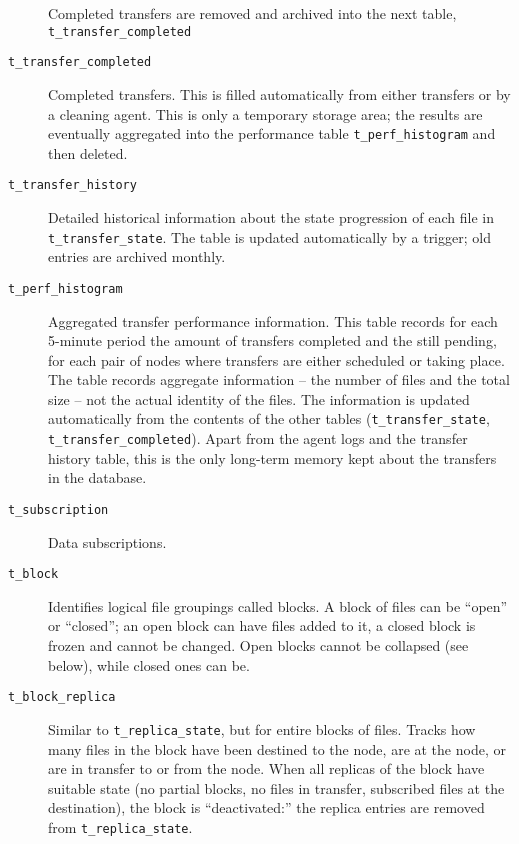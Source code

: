 \documentclass{cmspaper}
\begin{document}
\begin{description}
    Completed transfers are removed and archived into the next
    table, \texttt{t\_transfer\_completed}

  \item [\texttt{t\_transfer\_completed}]\mbox{}

    Completed transfers.  This is filled automatically from either
    transfers or by a cleaning agent.  This is only a temporary
    storage area; the results are eventually aggregated into the
    performance table \texttt{t\_perf\_histogram} and then deleted.

  \item [\texttt{t\_transfer\_history}]\mbox{}

    Detailed historical information about the state progression of
    each file in \texttt{t\_transfer\_state}.  The table is updated
    automatically by a trigger; old entries are archived monthly.

  \item [\texttt{t\_perf\_histogram}]\mbox{}

    Aggregated transfer performance information.  This table records
    for each 5-minute period the amount of transfers completed and
    the still pending, for each pair of nodes where transfers are
    either scheduled or taking place.  The table records aggregate
    information -- the number of files and the total size -- not
    the actual identity of the files.  The information is updated
    automatically from the contents of the other tables
    (\texttt{t\_transfer\_state}, \texttt{t\_transfer\_completed}).
    Apart from the agent logs and the transfer history table, this
    is the only long-term memory kept about the transfers in the
    database.

  \item [\texttt{t\_subscription}]\mbox{}

    Data subscriptions.

  \item [\texttt{t\_block}]\mbox{}

    Identifies logical file groupings called blocks.  A block of
    files can be ``open'' or ``closed''; an open block can have
    files added to it, a closed block is frozen and cannot be
    changed.  Open blocks cannot be collapsed (see below), while
    closed ones can be.

  \item [\texttt{t\_block\_replica}]\mbox{}

    Similar to \texttt{t\_replica\_state}, but for entire blocks of
    files.  Tracks how many files in the block have been destined
    to the node, are at the node, or are in transfer to or from
    the node.  When all replicas of the block have suitable state
    (no partial blocks, no files in transfer, subscribed files at
    the destination), the block is ``deactivated:'' the replica
    entries are removed from \texttt{t\_replica\_state}.


\end{description}
\end{document}
